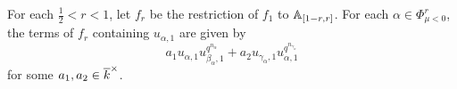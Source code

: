 \documentclass[12pt,reqno]{amsart}
\begin{document}
\begin{prop} \label{prop:highest_term_f_r}
    For each $\tfrac{1}{2} < r < 1$, let $f_r$ be the restriction of $f_1$ to $\mathbb{A}_{[1-r, r]}$. For each $\alpha \in \Phi^{r}_{\mu < 0}$, the terms of $f_{r}$ containing $u_{\alpha, 1}$ are given by 
    \[
        a_1 u_{\alpha, 1} u_{\beta_\alpha, 1}^{q^{n_\alpha}} + a_2 u_{\gamma_\alpha, 1} u_{\alpha, 1}^{q^{n_{\gamma_\alpha}}}
    \]
    for some $a_1, a_2 \in {\overline{k}}^\times$. 
\end{prop}
\end{document}
